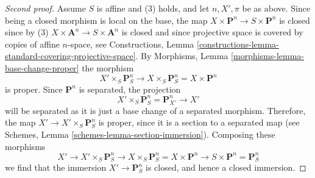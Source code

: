 \documentclass[10pt,a4paper]{amsart}
\theoremstyle{plain}
\theoremstyle{definition}
\theoremstyle{remark}
\numberwithin{equation}{subsection}
\begin{document}
\begin{proof}[Second proof]
\medskip\noindent
Assume $S$ is affine and (3) holds, and let $n, X', \pi$ be as above.
Since being a closed morphism is local on the base, the map
$X \times \mathbf{P}^n \to S \times \mathbf{P}^n$ is closed since by (3)
$X \times \mathbf{A}^n \to S \times \mathbf{A}^n$ is closed and since
projective space is covered by copies of affine $n$-space, see
Constructions,
Lemma \ref{constructions-lemma-standard-covering-projective-space}.
By Morphisms, Lemma \ref{morphisms-lemma-base-change-proper}
the morphism
$$
X' \times_S \mathbf{P}^n_S
\to
X \times_S \mathbf{P}^n_S =
X \times \mathbf{P}^n
$$
is proper. Since $\mathbf{P}^n$ is separated, the projection
$$
X' \times_S \mathbf{P}^n_S = \mathbf{P}^n_{X'} \to X'
$$
will be separated as it is just a base change of a separated
morphism. Therefore, the map $X' \to X' \times_S \mathbf{P}^n_S$ is proper,
since it is a section to a separated map (see
Schemes, Lemma \ref{schemes-lemma-section-immersion}).
Composing these morphisms
$$
X' \to X' \times_S \mathbf{P}^n_S \to X \times_S \mathbf{P}^n_S
= X \times \mathbf{P}^n \to S \times \mathbf{P}^n = \mathbf{P}^n_S
$$
we find that the immersion $X' \to \mathbf{P}^n_S$ is closed, and
hence a closed immersion.
\end{proof}
\end{document}
